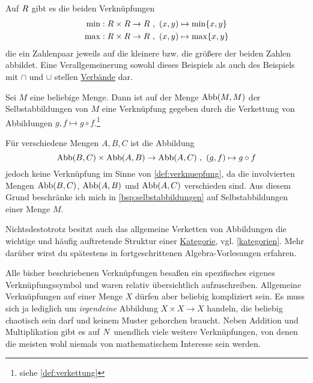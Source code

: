 \begin{bsp} \label{bsp:minmaxverknuepfung}
    Auf $\relax R$ gibt es die beiden Verknüpfungen
    \begin{align*}
        \min : \relax R\times \relax R\to \relax R\ &,\ (x,y)\mapsto \min\{x,y\} \\
        \max : \relax R\times \relax R\to \relax R\ &,\ (x,y)\mapsto \max\{x,y\}
    \end{align*}
    die ein Zahlenpaar jeweils auf die kleinere bzw. die größere der beiden Zahlen abbildet. Eine Verallgemeinerung sowohl dieses Beispiels als auch des Beispiels mit $\cap$ und $\cup$ stellen \href{https://de.wikipedia.org/wiki/Verband_(Mathematik)}{Verbände} dar.
\end{bsp}


\begin{bsp} \label{bsp:selbstabbildungen}
    Sei $M$ eine beliebige Menge. Dann ist auf der Menge $\operatorname{Abb}(M,M)$ der Selbstabbildungen von $M$ eine Verknüpfung gegeben durch die Verkettung von Abbildungen $g,f\mapsto g\circ f$.\footnote{siehe \cref{def:verkettung}}
\end{bsp}


\begin{bem}[*]
    Für verschiedene Mengen $A,B,C$ ist die Abbildung
        \[ \operatorname{Abb}(B,C) \times \operatorname{Abb}(A,B) \to \operatorname{Abb}(A,C) \ ,\ (g,f) \mapsto g\circ f \]
    jedoch keine Verknüpfung im Sinne von \cref{def:verknuepfung}, da die involvierten Mengen $\operatorname{Abb}(B,C)$, $\operatorname{Abb}(A,B)$ und $\operatorname{Abb}(A,C)$ verschieden sind. Aus diesem Grund beschränke ich mich in \cref{bsp:selbstabbildungen} auf Selbstabbildungen einer Menge $M$.

    Nichtsdestotrotz besitzt auch das allgemeine Verketten von Abbildungen die wichtige und häufig auftretende Struktur einer \href{https://ncatlab.org/nlab/show/category}{Kategorie}, vgl. \cref{kategorien}. Mehr darüber wirst du spätestens in fortgeschrittenen Algebra-Vorlesungen erfahren.
\end{bem}


\begin{bem}
    Alle bisher beschriebenen Verknüpfungen besaßen ein spezifisches eigenes Verknüpfungssymbol und waren relativ übersichtlich aufzuschreiben. Allgemeine Verknüpfungen auf einer Menge $X$ dürfen aber beliebig kompliziert sein. Es muss sich ja lediglich um \emph{irgendeine} Abbildung $X\times X\to X$ handeln, die beliebig chaotisch sein darf und keinem Muster gehorchen braucht. Neben Addition und Multiplikation gibt es auf $\relax N$ unendlich viele weitere Verknüpfungen, von denen die meisten wohl niemals von mathematischem Interesse sein werden.
\end{bem}


